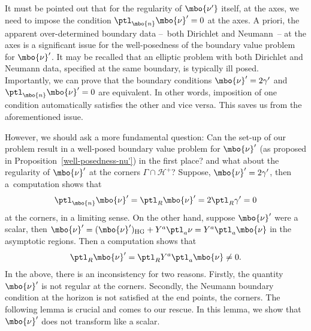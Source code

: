 It must be pointed out that for the regularity of $\mbo{\nu'}$ itself, at the axes, we need to impose the condition $\ptl_{\mbo{n}} \mbo{\nu}'=0$ at the axes. A priori, the apparent over-determined boundary data --~both Dirichlet and Neumann~-- at the axes is a significant issue for the well-posedness of the boundary value problem for $\mbo{\nu}'$. It may be recalled that an elliptic problem with both Dirichlet and Neumann data, specified at the same boundary, is typically ill posed. Importantly, we can prove that the boundary conditions $\mbo{\nu}' = 2 \gamma'$ and $\ptl_{\mbo{n}} \mbo{\nu}'=0$ are equivalent. In other words, imposition of one condition automatically satisfies the other and vice versa. This saves us from the aforementioned issue.

However, we should ask a more fundamental question: Can the set-up of our problem result in a well-posed boundary value problem for $\mbo{\nu}'$ (as proposed in Proposition~\ref{well-posedness-nu'}) in the first place? and what about the regularity of $\mbo{\nu}'$ at the corners $\Gamma \cap \mathcal{H}^+$?
Suppose, $\mbo{\nu}' = 2 \gamma'$, then a~computation shows that
\begin{align*}
\ptl_{\mbo{n}} \mbo{\nu}' = \ptl_R \mbo{\nu}'= 2 \ptl_R \gamma' =0
\end{align*}
at the corners, in a limiting sense. On the other hand, suppose $\mbo{\nu}'$ were a scalar, then $\mbo{\nu}' = (\mbo{\nu}')_{{\rm HG}} + Y^a \ptl_a \nu = Y^a \ptl_a \mbo{\nu}$ in the asymptotic regions. Then a computation shows that
\begin{align*}
\ptl_R \mbo{\nu}' = \ptl_R Y^a \ptl_a \mbo{\nu} \neq 0.
\end{align*}
In the above, there is an inconsistency for two reasons. Firstly, the quantity $\mbo{\nu}'$ is not regular at the corners. Secondly, the Neumann boundary condition at the horizon is not satisfied at the end points, the corners. The following lemma is crucial and comes to our rescue. In this lemma, we show that $\mbo{\nu}'$ does not transform like a scalar.

